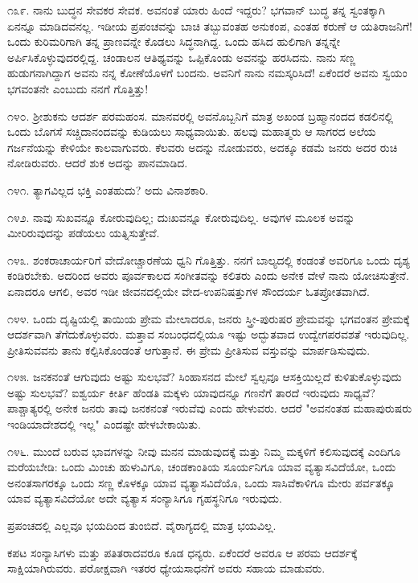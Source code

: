 ೧೩೯. ನಾನು ಬುದ್ಧನ ಸೇವಕರ ಸೇವಕ. ಅವನಂತೆ ಯಾರು ಹಿಂದೆ ಇದ್ದರು? ಭಗವಾನ್ ಬುದ್ಧ ತನ್ನ ಸ್ವಂತಕ್ಕಾಗಿ ಏನನ್ನೂ ಮಾಡಿದವನಲ್ಲ. ಇಡೀಯ ಪ್ರಪಂಚವನ್ನು ಬಾಚಿ ತಬ್ಬುವಂತಹ ಅನುಕಂಪ, ಎಂತಹ ಕರುಣೆ ಆ ಯತಿರಾಜನಿಗೆ! ಒಂದು ಕುರಿಮರಿಗಾಗಿ ತನ್ನ ಪ್ರಾಣವನ್ನೇ ಕೊಡಲು ಸಿದ್ಧನಾಗಿದ್ದ. ಒಂದು ಹಸಿದ ಹುಲಿಗಾಗಿ ತನ್ನನ್ನೇ ಅರ್ಪಿಸಿಕೊಳ್ಳುವುದರಲ್ಲಿದ್ದ. ಚಂಡಾಲನ ಆತಿಥ್ಯವನ್ನು ಒಪ್ಪಿಕೊಂಡು ಅವನನ್ನು ಹರಸಿದನು. ನಾನು ಸಣ್ಣ ಹುಡುಗನಾಗಿದ್ದಾಗ ಅವನು ನನ್ನ ಕೋಣೆಯೊಳಗೆ ಬಂದನು. ಅವನಿಗೆ ನಾನು ನಮಸ್ಕರಿಸಿದೆ! ಏಕೆಂದರೆ ಅವನು ಸ್ವಯಂ ಭಗವಂತನೇ ಎಂಬುದು ನನಗೆ ಗೊತ್ತಿತ್ತು!

೧೪೦. ಶ‍್ರೀಶುಕನು ಆದರ್ಶ ಪರಮಹಂಸ. ಮಾನವರಲ್ಲಿ ಅವನೊಬ್ಬನಿಗೆ ಮಾತ್ರ ಅಖಂಡ ಬ್ರಹ್ಮಾನಂದದ ಕಡಲಿನಲ್ಲಿ ಒಂದು ಬೊಗಸೆ ಸಚ್ಚಿದಾನಂದವನ್ನು ಕುಡಿಯಲು ಸಾಧ್ಯವಾಯಿತು. ಹಲವು ಮಹಾತ್ಮರು ಆ ಸಾಗರದ ಅಲೆಯ ಗರ್ಜನೆಯನ್ನು ಕೇಳಿಯೇ ಕಾಲವಾಗುವರು. ಕೆಲವರು ಅದನ್ನು ನೋಡುವರು, ಅದಕ್ಕೂ ಕಡಮೆ ಜನರು ಅದರ ರುಚಿ ನೋಡಿರುವರು. ಆದರೆ ಶುಕ ಅದನ್ನು ಪಾನಮಾಡಿದ.

೧೪೧. ತ್ಯಾಗವಿಲ್ಲದ ಭಕ್ತಿ ಎಂತಹುದು? ಅದು ವಿನಾಶಕಾರಿ.

೧೪೨. ನಾವು ಸುಖವನ್ನೂ ಕೋರುವುದಿಲ್ಲ; ದುಃಖವನ್ನೂ ಕೋರುವುದಿಲ್ಲ. ಅವುಗಳ ಮೂಲಕ ಅವನ್ನು ಮೀರಿರುವುದನ್ನು ಪಡೆಯಲು ಯತ್ನಿಸುತ್ತೇವೆ.

೧೪೩. ಶಂಕರಾಚಾರ್ಯರಿಗೆ ವೇದೋಚ್ಚಾರಣೆಯ ಧ್ವನಿ ಗೊತ್ತಿತ್ತು. ನನಗೆ ಬಾಲ್ಯದಲ್ಲಿ ಕಂಡಂತೆ ಅವರಿಗೂ ಒಂದು ದೃಶ್ಯ ಕಂಡಿರಬೇಕು. ಅದರಿಂದ ಅವರು ಪೂರ್ವಕಾಲದ ಸಂಗೀತವನ್ನು ಕಲಿತರು ಎಂದು ಅನೇಕ ವೇಳೆ ನಾನು ಯೋಚಿಸುತ್ತೇನೆ. ಏನಾದರೂ ಆಗಲಿ, ಅವರ ಇಡೀ ಜೀವನದಲ್ಲಿಯೇ ವೇದ-ಉಪನಿಷತ್ತುಗಳ ಸೌಂದರ್ಯ ಓತಪ್ರೋತವಾಗಿದೆ.

೧೪೪. ಒಂದು ದೃಷ್ಟಿಯಲ್ಲಿ ತಾಯಿಯ ಪ್ರೇಮ ಮೇಲಾದರೂ, ಜನರು ಸ್ತ್ರೀ-ಪುರುಷರ ಪ್ರೇಮವನ್ನು ಭಗವಂತನ ಪ್ರೇಮಕ್ಕೆ ಆದರ್ಶವಾಗಿ ತೆಗೆದುಕೊಳ್ಳುವರು. ಮತ್ತಾವ ಸಂಬಂಧದಲ್ಲಿಯೂ ಇಷ್ಟು ಅದ್ಭುತವಾದ ಉದ್ವೇಗಪರವಶತೆ ಇರುವುದಿಲ್ಲ. ಪ್ರೀತಿಸುವವನು ತಾನು ಕಲ್ಪಿಸಿಕೊಂಡಂತೆ ಆಗುತ್ತಾನೆ. ಈ ಪ್ರೇಮ ಪ್ರೀತಿಸುವ ವಸ್ತುವನ್ನು ಮಾರ್ಪಡಿಸುವುದು.

೧೪೫. ಜನಕನಂತೆ ಆಗುವುದು ಅಷ್ಟು ಸುಲಭವೆ? ಸಿಂಹಾಸನದ ಮೇಲೆ ಸ್ವಲ್ಪವೂ ಆಸಕ್ತಿಯಿಲ್ಲದೆ ಕುಳಿತುಕೊಳ್ಳುವುದು ಅಷ್ಟು ಸುಲಭವೆ? ಐಶ್ವರ್ಯ ಕೀರ್ತಿ ಹೆಂಡತಿ ಮಕ್ಕಳು ಯಾವುದನ್ನೂ ಗಣನೆಗೆ ತಾರದೆ ಇರುವುದು ಸಾಧ್ಯವೆ? ಪಾಶ್ಚಾತ್ಯರಲ್ಲಿ ಅನೇಕ ಜನರು ತಾವು ಜನಕನಂತೆ ಇರುವೆವು ಎಂದು ಹೇಳುವರು. ಆದರೆ "ಅವನಂತಹ ಮಹಾಪುರುಷರು ಇಂಡಿಯಾದೇಶದಲ್ಲಿ ಇಲ್ಲ" ಎಂದಷ್ಟೇ ಹೇಳಬೇಕಾಯಿತು.

೧೪೬. ಮುಂದೆ ಬರುವ ಭಾವಗಳನ್ನು ನೀವು ಮನನ ಮಾಡುವುದಕ್ಕೆ ಮತ್ತು ನಿಮ್ಮ ಮಕ್ಕಳಿಗೆ ಕಲಿಸುವುದಕ್ಕೆ ಎಂದಿಗೂ ಮರೆಯಬೇಡಿ: ಒಂದು ಮಿಂಚು ಹುಳುವಿಗೂ, ಚಂಡಕಾಂತಿಯ ಸೂರ್ಯನಿಗೂ ಯಾವ ವ್ಯತ್ಯಾಸವಿದೆಯೋ, ಒಂದು ಅನಂತಸಾಗರಕ್ಕೂ ಒಂದು ಸಣ್ಣ ಕೊಳಕ್ಕೂ ಯಾವ ವ್ಯತ್ಯಾಸವಿದೆಯೊ, ಒಂದು ಸಾಸಿವೆಕಾಳಿಗೂ ಮೇರು ಪರ್ವತಕ್ಕೂ ಯಾವ ವ್ಯತ್ಯಾಸವಿದೆಯೋ ಅದೇ ವ್ಯತ್ಯಾಸ ಸಂನ್ಯಾಸಿಗೂ ಗೃಹಸ್ಥನಿಗೂ ಇರುವುದು.

ಪ್ರಪಂಚದಲ್ಲಿ ಎಲ್ಲವೂ ಭಯದಿಂದ ತುಂಬಿದೆ. ವೈರಾಗ್ಯದಲ್ಲಿ ಮಾತ್ರ ಭಯವಿಲ್ಲ.

ಕಪಟ ಸಂನ್ಯಾಸಿಗಳು ಮತ್ತು ಪತಿತರಾದವರೂ ಕೂಡ ಧನ್ಯರು. ಏಕೆಂದರೆ ಅವರೂ ಆ ಪರಮ ಆದರ್ಶಕ್ಕೆ ಸಾಕ್ಷಿಯಾಗಿರುವರು. ಪರೋಕ್ಷವಾಗಿ ಇತರರ ಧ್ಯೇಯಸಾಧನೆಗೆ ಅವರು ಸಹಾಯ ಮಾಡುವರು.

